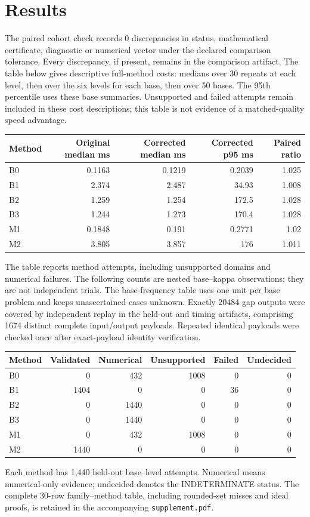 \documentclass[10pt]{article}
\begin{document}
\section{Results}
The paired cohort check records 0 discrepancies in status, mathematical certificate, diagnostic or numerical vector under the declared comparison tolerance. Every discrepancy, if present, remains in the comparison artifact. The table below gives descriptive full-method costs: medians over 30 repeats at each level, then over the six levels for each base, then over 50 bases. The 95th percentile uses these base summaries. Unsupported and failed attempts remain included in these cost descriptions; this table is not evidence of a matched-quality speed advantage.

\begin{center}\small
\begin{tabular}{lrrrr}\toprule
Method & Original median ms & Corrected median ms & Corrected p95 ms & Paired ratio\\\midrule
B0 & 0.1163 & 0.1219 & 0.2039 & 1.025 \\
B1 & 2.374 & 2.487 & 34.93 & 1.008 \\
B2 & 1.259 & 1.254 & 172.5 & 1.028 \\
B3 & 1.244 & 1.273 & 170.4 & 1.028 \\
M1 & 0.1848 & 0.191 & 0.2771 & 1.02 \\
M2 & 3.805 & 3.857 & 176 & 1.011 \\
\bottomrule\end{tabular}\end{center}

The table reports method attempts, including unsupported domains and numerical failures. The following counts are nested base--kappa observations; they are not independent trials. The base-frequency table uses one unit per base problem and keeps unascertained cases unknown. Exactly 20484 gap outputs were covered by independent replay in the held-out and timing artifacts, comprising 1674 distinct complete input/output payloads. Repeated identical payloads were checked once after exact-payload identity verification.

\begin{center}\small
\begin{tabular}{lrrrrr}\toprule
Method & Validated & Numerical & Unsupported & Failed & Undecided\\\midrule
B0 & 0 & 432 & 1008 & 0 & 0 \\
B1 & 1404 & 0 & 0 & 36 & 0 \\
B2 & 0 & 1440 & 0 & 0 & 0 \\
B3 & 0 & 1440 & 0 & 0 & 0 \\
M1 & 0 & 432 & 1008 & 0 & 0 \\
M2 & 1440 & 0 & 0 & 0 & 0 \\
\bottomrule\end{tabular}\end{center}
Each method has 1,440 held-out base--level attempts. Numerical means numerical-only evidence; undecided denotes the INDETERMINATE status. The complete 30-row family--method table, including rounded-set misses and ideal proofs, is retained in the accompanying \texttt{supplement.pdf}.
\end{document}
